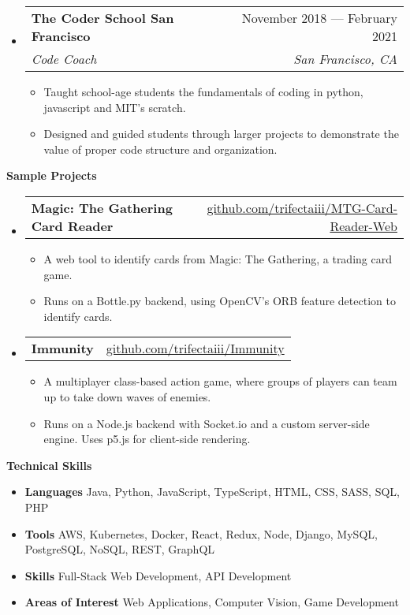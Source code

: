 \documentclass[letterpaper,12pt]{article}[leftmargin=*]
\makeatletter
\def \entryspacing {-0pt}
\renewcommand{\section}[2]{\vspace{5pt}
  \colorbox{secondary}{\color{white}\raggedbottom\normalsize\textbf{{#1}{\hspace{7pt}#2}}}
}
\newcommand{\resumeEntryStart}{\begin{itemize}[leftmargin=2.5mm]}
\newcommand{\resumeEntryEnd}{\end{itemize}\vspace{\entryspacing}}
\newcommand{\resumeItemListStart}{\begin{itemize}[leftmargin=4.5mm]}
\newcommand{\resumeItemListEnd}{\end{itemize}}
\newcommand{\resumeItem}[1]{
  \item{%
    {#1 \vspace{-2pt}}
  }
}
\newcommand{\resumeEntryTSDL}[4]{
  \vspace{-1pt}\item[]
    \begin{tabular*}{0.97\textwidth}{l@{\extracolsep{\fill}}r}
      \textbf{\color{primary}#1} & {\firabook\color{accent}\small#2} \\
      \textit{\color{accent}\small#3} & \textit{\color{accent}\small#4} \\
    \end{tabular*}\vspace{-6pt}
}
\newcommand{\resumeEntryTD}[2]{
  \vspace{-1pt}\item[]
    \begin{tabular*}{0.97\textwidth}{l@{\extracolsep{\fill}}r}
      \textbf{\color{primary}#1} & {\firabook\color{accent}\small#2} \\
    \end{tabular*}\vspace{-6pt}
}
\newcommand{\resumeEntryS}[2]{
  \item[]\small{
    \textbf{\color{primary}#1 }{ #2 \vspace{-6pt}}
  }
}
\makeatother
\begin{document}
  \resumeEntryStart
    \resumeEntryTSDL
      {The Coder School San Francisco}{November 2018 --- February 2021}
      {Code Coach}{San Francisco, CA}
    \resumeItemListStart
      \resumeItem {Taught school-age students the fundamentals of coding in python, javascript and MIT's scratch.}
      \resumeItem {Designed and guided students through larger projects to demonstrate the value of proper code structure and organization.}
    \resumeItemListEnd
  \resumeEntryEnd

\section{\faFlask}{Sample Projects}

  \resumeEntryStart
    \resumeEntryTD
      {Magic: The Gathering Card Reader}{\href{https://github.com/trifectaiii/MTG-Card-Reader-Web}{github.com/trifectaiii/MTG-Card-Reader-Web}}
    \resumeItemListStart
      \resumeItem {A web tool to identify cards from Magic: The Gathering, a trading card game.}
      \resumeItem {Runs on a Bottle.py backend, using OpenCV's ORB feature detection to identify cards.}
    \resumeItemListEnd
  \resumeEntryEnd
  
  \resumeEntryStart
    \resumeEntryTD
      {Immunity}{\href{https://github.com/trifectaiii/Multiplayer-Game}{github.com/trifectaiii/Immunity}}
    \resumeItemListStart
      \resumeItem {A multiplayer class-based action game, where groups of players can team up to take down waves of enemies.}
      \resumeItem {Runs on a Node.js backend with Socket.io and a custom server-side engine. Uses p5.js for client-side rendering.}
    \resumeItemListEnd
  \resumeEntryEnd

\section{\faGears}{Technical Skills}
 \resumeEntryStart
  \resumeEntryS{Languages } {Java, Python, JavaScript, TypeScript, HTML, CSS, SASS, SQL, PHP}
  \resumeEntryS{Tools } {AWS, Kubernetes, Docker, React, Redux, Node, Django, MySQL, PostgreSQL, NoSQL, REST, GraphQL}
  \resumeEntryS{Skills } {Full-Stack Web Development, API Development }
  \resumeEntryS{Areas of Interest } {Web Applications, Computer Vision, Game Development}
 \resumeEntryEnd
 
\begin{center}
\begin{scriptsize}
\end{scriptsize}
\end{center}
\end{document}
